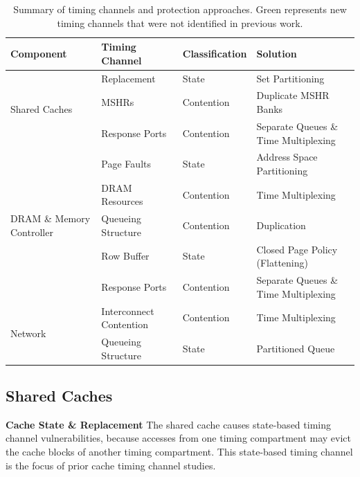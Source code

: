 \def\novelcolor{Green}
\begin{table}
\begin{tabular}{l|l|l|l}
    \hline
    Component & Timing Channel & Classification & Solution\\
    \hline
    \multirow{3}{*}{Shared Caches}
    & Replacement & State  & Set Partitioning \\
    \hhline{~---}
    & {\color{\novelcolor}MSHRs}
    & {\color{\novelcolor}Contention }
    & {\color{\novelcolor}Duplicate MSHR Banks} \\
    \hhline{~---}
    & {\color{\novelcolor}Response Ports}
    & {\color{\novelcolor}Contention }
    & {\color{\novelcolor}Separate Queues \& Time Multiplexing}\\
    \hline
    \multirow{5}{*}{DRAM \& Memory Controller}
    & Page Faults & State  & Address Space Partitioning \\
    \hhline{~---}
    & DRAM Resources & Contention  & Time Multiplexing \\
    \hhline{~---}
    & Queueing Structure & Contention & Duplication \\
    \hhline{~---}
    & Row Buffer & State & Closed Page Policy (Flattening)\\
    \hhline{~---}
    & {\color{\novelcolor} Response Ports} & {\color{\novelcolor} Contention }
    & {\color{\novelcolor} Separate Queues \& Time Multiplexing}\\
    \hline
    \multirow{2}{*}{Network} & Interconnect Contention & Contention & Time 
    Multiplexing \\
    \hhline{~---}
    & Queueing Structure & State & Partitioned Queue \\
\end{tabular}
    \caption{Summary of timing channels and protection approaches. Green 
    represents new timing channels that were not identified in previous work.}
    \label{table:timing_chan_summary}
\end{table}

\subsection{Shared Caches}
\mbox{}\newline
\textbf{Cache State \& Replacement}
The shared cache causes state-based timing channel vulnerabilities, because 
accesses from one timing compartment may evict the cache blocks of another
timing compartment. This state-based timing channel is the focus of prior
cache timing channel studies.

